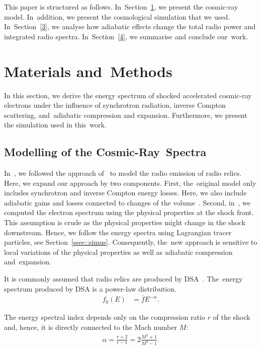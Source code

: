 \documentclass[galaxies,article,accept,moreauthors,pdftex]{mdpi}
\begin{document}
 This paper is structured as follows. In~Section~\ref{2}, we present the cosmic-ray model. In~addition, we present the cosmological simulation that we used. In~Section~\ref{3}, we analyse how adiabatic effects change the total radio power and integrated radio spectra. In~\mbox{Section~\ref{4}}, we summarise and conclude our~work. 
 


\section{Materials and~Methods}\label{2}

In this section, we derive the energy spectrum of shocked accelerated cosmic-ray electrons under the influence of synchrotron radiation, inverse Compton scattering, and~adiabatic compression and expansion.  Furthermore, we present the simulation used in this~work.

\subsection{Modelling of the Cosmic-Ray~Spectra}\label{ssec::spectra}

In~\cite{wittor2019pol,wittor2021mach}, we followed the approach of~\cite{2007MNRAS.375...77H} to model the radio emission of radio relics. Here, we expand our approach by two components. First, the~original model only includes synchrotron and inverse Compton energy losses. Here, we also include adiabatic gains and losses connected to changes of the volume~\cite{1960AZh....37..256S}. Second, in~\cite{wittor2019pol,wittor2021mach}, we computed the electron spectrum using the physical properties at the shock front. This assumption is crude as the physical properties might change in the shock downstream. Hence, we follow the energy spectra using Lagrangian tracer particles, see Section~\ref{ssec::simus}. Consequently, the~new approach is sensitive to local variations of the physical properties as well as adiabatic compression and~expansion.

It is commonly assumed that radio relics are produced by DSA~\cite{ensslin1998}. The~energy spectrum produced by DSA is a power-law distribution.
\begin{align}
  f_0(E) &= \bar{f} E^{-\alpha}. \label{eq::f0}
\end{align}

The energy spectral index depends only on the compression ratio $r$ of the shock and, hence, it is directly connected to the Mach number $M$:
\begin{align}
 \alpha =\frac{r+2}{r-1} = 2\frac{M^2+1}{M^2-1}.
\end{align}
\end{document}
